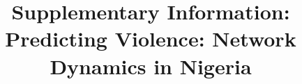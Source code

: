 \documentclass[12pt,pdflatex,authoryear]{elsarticle}
\begin{document}
\thispagestyle{empty}
\begin{frontmatter}

\title{Supplementary Information: \\Predicting Violence: Network Dynamics in Nigeria}

%





\end{frontmatter}

\newpage\setcounter{page}{1} 



\clearpage

% 
% 
% 


\end{document}
